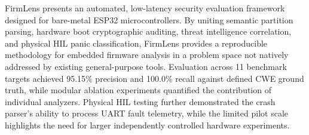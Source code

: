 \documentclass[conference]{IEEEtran}
\begin{document}
FirmLens presents an automated, low-latency security evaluation framework designed for bare-metal ESP32 microcontrollers. By uniting semantic partition parsing, hardware boot cryptographic auditing, threat intelligence correlation, and physical HIL panic classification, FirmLens provides a reproducible methodology for embedded firmware analysis in a problem space not natively addressed by existing general-purpose tools. Evaluation across 11 benchmark targets achieved 95.15\% precision and 100.0\% recall against defined CWE ground truth, while modular ablation experiments quantified the contribution of individual analyzers. Physical HIL testing further demonstrated the crash parser's ability to process UART fault telemetry, while the limited pilot scale highlights the need for larger independently controlled hardware experiments.



\end{document}
